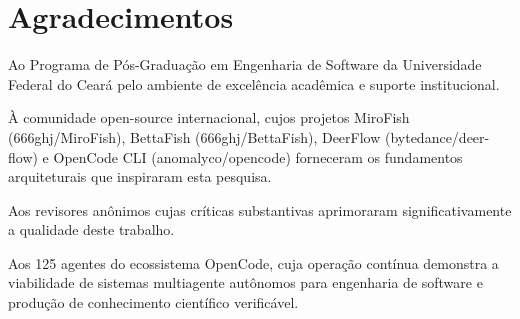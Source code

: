 \documentclass[12pt,a4paper,sumario=tradicional]{abntex2}
\begin{document}
\imprimircapa
\imprimirfolhaderosto

\newpage
\thispagestyle{empty}
\vspace*{10cm}
\begin{center}
\end{center}

\newpage
\chapter*{Agradecimentos}

Ao Programa de Pós-Graduação em Engenharia de Software da Universidade Federal do Ceará pelo ambiente de excelência acadêmica e suporte institucional.

À comunidade open-source internacional, cujos projetos MiroFish (666ghj/MiroFish), BettaFish (666ghj/BettaFish), DeerFlow (bytedance/deer-flow) e OpenCode CLI (anomalyco/opencode) forneceram os fundamentos arquiteturais que inspiraram esta pesquisa.

Aos revisores anônimos cujas críticas substantivas aprimoraram significativamente a qualidade deste trabalho.

Aos 125 agentes do ecossistema OpenCode, cuja operação contínua demonstra a viabilidade de sistemas multiagente autônomos para engenharia de software e produção de conhecimento científico verificável.
\end{document}
